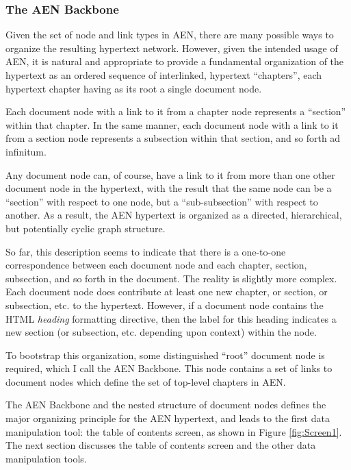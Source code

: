 \subsubsection{The AEN Backbone}
\label{sec:aen-backbone}

Given the set of node and link types in AEN, there are many possible ways
to organize the resulting hypertext network.  However, given the intended
usage of AEN, it is natural and appropriate to provide a fundamental
organization of the hypertext as an ordered sequence of interlinked,
hypertext ``chapters'', each hypertext chapter having as its root a single
document node.

Each document node with a link to it from a chapter node represents a
``section'' within that chapter. In the same manner, each document node
with a link to it from a section node represents a subsection within that
section, and so forth ad infinitum.

Any document node can, of course, have a link to it from more than one
other document node in the hypertext, with the result that the same node
can be a ``section'' with respect to one node, but a ``sub-subsection''
with respect to another.  As a result, the AEN hypertext is organized as a
directed, hierarchical, but potentially cyclic graph structure.

So far, this description seems to indicate that there is a one-to-one
correspondence between each document node and each chapter, section,
subsection, and so forth in the document.  The reality is slightly more
complex.  Each document node does contribute at least one new chapter, or
section, or subsection, etc. to the hypertext.  However, if a document
node contains the HTML {\em heading} formatting directive, then the label for
this heading indicates a new section (or subsection, etc. depending upon
context) within the node.

To bootstrap this organization, some distinguished ``root'' document node
is required, which I call the AEN Backbone.  This node contains a set of
links to document nodes which define the set of top-level chapters in AEN.

The AEN Backbone and the nested structure of document nodes defines the
major organizing principle for the AEN hypertext, and leads to the first
data manipulation tool: the table of contents screen, as shown in Figure
\ref{fig:Screen1}.  The next section discusses the table of contents screen
and the other data manipulation tools. 




